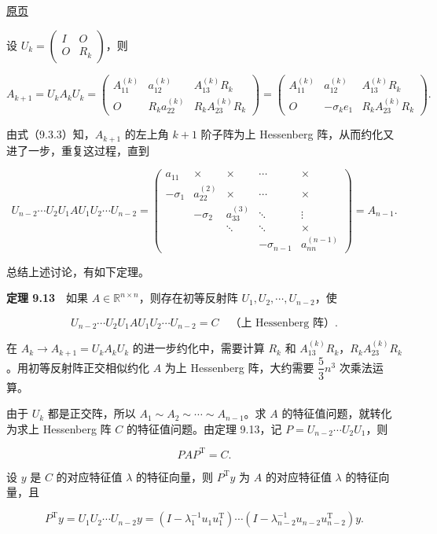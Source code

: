 \documentclass[
  10pt,
  fontset=fandol]{ctexart}
\begin{document}
\href{../../source-images/pdf-247.jpeg}{原页}

设 \(U_k=\begin{pmatrix}I&O\\O&R_k\end{pmatrix}\)，则

\[
A_{k+1}=U_kA_kU_k=
\begin{pmatrix}
A_{11}^{(k)}&a_{12}^{(k)}&A_{13}^{(k)}R_k\\
O&R_ka_{22}^{(k)}&R_kA_{23}^{(k)}R_k
\end{pmatrix}
=
\begin{pmatrix}
A_{11}^{(k)}&a_{12}^{(k)}&A_{13}^{(k)}R_k\\
O&-\sigma_ke_1&R_kA_{23}^{(k)}R_k
\end{pmatrix}.
\tag{9.3.3}
\]

由式（9.3.3）知，\(A_{k+1}\) 的左上角 \(k+1\) 阶子阵为上 Hessenberg 阵，从而约化又进了一步，重复这过程，直到

\[
U_{n-2}\cdots U_2U_1AU_1U_2\cdots U_{n-2}
=\begin{pmatrix}
a_{11}&\times&\times&\cdots&\times\\
-\sigma_1&a_{22}^{(2)}&\times&\cdots&\times\\
&-\sigma_2&a_{33}^{(3)}&\ddots&\vdots\\
&&\ddots&\ddots&\times\\
&&&-\sigma_{n-1}&a_{nn}^{(n-1)}
\end{pmatrix}=A_{n-1}.
\]

总结上述讨论，有如下定理。

\textbf{定理 9.13}　如果 \(A\in\mathbb R^{n\times n}\)，则存在初等反射阵 \(U_1,U_2,\cdots,U_{n-2}\)，使

\[
U_{n-2}\cdots U_2U_1AU_1U_2\cdots U_{n-2}=C\quad\text{（上 Hessenberg 阵）}.
\]

在 \(A_k\to A_{k+1}=U_kA_kU_k\) 的进一步约化中，需要计算 \(R_k\) 和 \(A_{13}^{(k)}R_k\)，\(R_kA_{23}^{(k)}R_k\)。用初等反射阵正交相似约化 \(A\) 为上 Hessenberg 阵，大约需要 \(\dfrac53n^3\) 次乘法运算。

由于 \(U_k\) 都是正交阵，所以 \(A_1\sim A_2\sim\cdots\sim A_{n-1}\)。求 \(A\) 的特征值问题，就转化为求上 Hessenberg 阵 \(C\) 的特征值问题。由定理 9.13，记 \(P=U_{n-2}\cdots U_2U_1\)，则

\[
PAP^{\mathrm T}=C.
\]

设 \(y\) 是 \(C\) 的对应特征值 \(\lambda\) 的特征向量，则 \(P^{\mathrm T}y\) 为 \(A\) 的对应特征值 \(\lambda\) 的特征向量，且

\[
P^{\mathrm T}y=U_1U_2\cdots U_{n-2}y
=(I-\lambda_1^{-1}u_1u_1^{\mathrm T})\cdots(I-\lambda_{n-2}^{-1}u_{n-2}u_{n-2}^{\mathrm T})y.
\]
\end{document}
